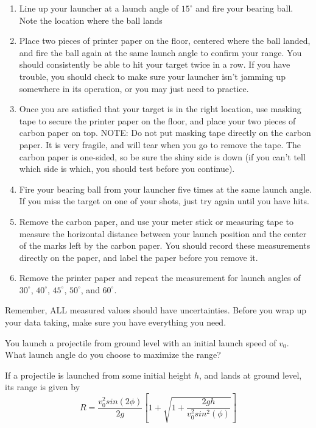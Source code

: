\begin{enumerate}
    \item Line up your launcher at a launch angle of $15^\circ$ and fire your bearing ball. Note the location where the ball lands
    \item Place two pieces of printer paper on the floor, centered where the ball landed, and fire the ball again at the same launch angle to confirm your range. You should consistently be able to hit your target twice in a row. If you have trouble, you should check to make sure your launcher isn't jamming up somewhere in its operation, or you may just need to practice.
    \item Once you are satisfied that your target is in the right location, use masking tape to secure the printer paper on the floor, and place your two pieces of carbon paper on top.  NOTE: Do not put masking tape directly on the carbon paper. It is very fragile, and will tear when you go to remove the tape.  The carbon paper is one-sided, so be sure the shiny side is down (if you can't tell which side is which, you should test before you continue).
    \item Fire your bearing ball from your launcher five times at the same launch angle. If you miss the target on one of your shots, just try again until you have hits.
    \item Remove the carbon paper, and use your meter stick or measuring tape to measure the horizontal distance between your launch position and the center of the marks left by the carbon paper.  You should record these measurements directly on the paper, and label the paper before you remove it.
    \item Remove the printer paper and repeat the measurement for launch angles of $30^\circ$, $40^\circ$, $45^\circ$, $50^\circ$, and $60^\circ$.
\end{enumerate}

\selfcheck

Remember, ALL measured values should have uncertainties. Before you wrap up your data taking, make sure you have everything you need.

\prelab

\prelabquestion
You launch a projectile from ground level with an initial launch speed of $v_0$. What launch angle do you choose to maximize the range?

\prelabquestion
If a projectile is launched from some initial height $h$, and lands at ground level, its range is given by 
    \begin{equation}\label{eqn:Range}
        R=\frac{v_0^2 sin(2\phi)}{2g}\left[ 1+\sqrt{1+\frac{2gh}{v_0^2 sin^2(\phi)}} \right]
    \end{equation}
    
